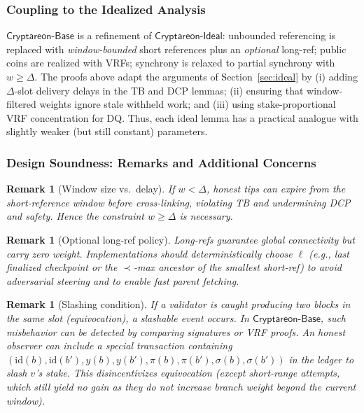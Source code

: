 \documentclass[11pt]{article}
\newtheorem{remark}[theorem]{Remark}
\newcommand{\ProjIdeal}{\ensuremath{\mathsf{Cryptareon\text{-}Ideal}}\xspace}
\newcommand{\ProjBase}{\ensuremath{\mathsf{Cryptareon\text{-}Base}}\xspace}
\newcommand{\id}{\ensuremath{\mathrm{id}}\xspace}
\begin{document}
\subsubsection{Coupling to the Idealized Analysis}
\label{subsec:base-coupling}
\ProjBase is a refinement of \ProjIdeal: unbounded referencing is replaced with \emph{window-bounded} short references plus an \emph{optional} long-ref; public coins are realized with VRFs; synchrony is relaxed to partial synchrony with $w\ge \Delta$. The proofs above adapt the arguments of Section~\ref{sec:ideal} by (i) adding $\Delta$-slot delivery delays in the TB and DCP lemmas; (ii) ensuring that window-filtered weights ignore stale withheld work; and (iii) using stake-proportional VRF concentration for DQ. Thus, each ideal lemma has a practical analogue with slightly weaker (but still constant) parameters.

\subsubsection{Design Soundness: Remarks and Additional Concerns}
\label{subsec:base-remarks}
\begin{remark}[Window size vs.\ delay]
If $w<\Delta$, honest tips can \emph{expire} from the short-reference window before cross-linking, violating TB and undermining DCP and safety. Hence the constraint $w\ge \Delta$ is \emph{necessary}.
\end{remark}

\begin{remark}[Optional long-ref policy]
Long-refs guarantee global connectivity but carry zero weight. Implementations should \emph{deterministically} choose $\ell$ (e.g., last finalized checkpoint or the $\prec$-max ancestor of the smallest short-ref) to avoid adversarial steering and to enable fast parent fetching.
\end{remark}

\begin{remark}[Slashing condition]
If a validator is caught producing two blocks in the same slot (equivocation), a slashable event occurs. In \ProjBase, such misbehavior can be detected by comparing signatures or VRF proofs. An honest observer can include a special transaction containing $(\id(b),\id(b'),y(b),y(b'),\pi(b),\pi(b'),\sigma(b),\sigma(b'))$ in the ledger to slash $v$'s stake. This disincentivizes equivocation (except short-range attempts, which still yield no gain as they do not increase branch weight beyond the current window).
\end{remark}
\end{document}
